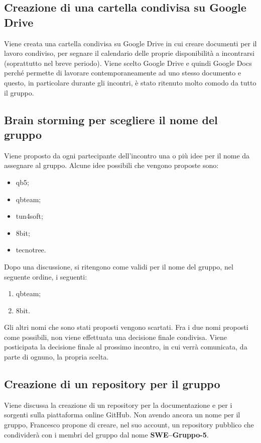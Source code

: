\subsection{Creazione di una cartella condivisa su Google Drive}
Viene creata una cartella condivisa su Google Drive in cui creare documenti per il lavoro condiviso, per segnare il calendario delle proprie disponibilità a incontrarsi (soprattutto nel breve periodo).
Viene scelto Google Drive e quindi Google Docs perché permette di lavorare contemporaneamente ad uno stesso documento e questo, in particolare durante gli incontri, è stato ritenuto molto comodo da tutto il gruppo.

\subsection{Brain storming per scegliere il nome del gruppo}
Viene proposto da ogni partecipante dell'incontro una o più idee per il nome da assegnare al gruppo. Alcune idee possibili che vengono proposte sono:
\begin{itemize}
	\item qb5;
	\item qbteam;
	\item tun4soft;
	\item 8bit;
	\item tecnotree.
\end{itemize}
Dopo una discussione, si ritengono come validi per il nome del gruppo, nel seguente ordine, i seguenti:
\begin{enumerate}
	\item qbteam;
	\item 8bit.
\end{enumerate}
Gli altri nomi che sono stati proposti vengono scartati. Fra i due nomi proposti come possibili, non viene effettuata una decisione finale condivisa. Viene posticipata la decisione finale al prossimo incontro, in cui verrà comunicata, da parte di ognuno, la propria scelta.

\subsection{Creazione di un repository per il gruppo}
Viene discussa la creazione di un repository per la documentazione e per i sorgenti sulla piattaforma online GitHub.
Non avendo ancora un nome per il gruppo, Francesco propone di creare, nel suo account, un repository pubblico che condividerà con i membri del gruppo dal nome \textbf{SWE--Gruppo-5}.

